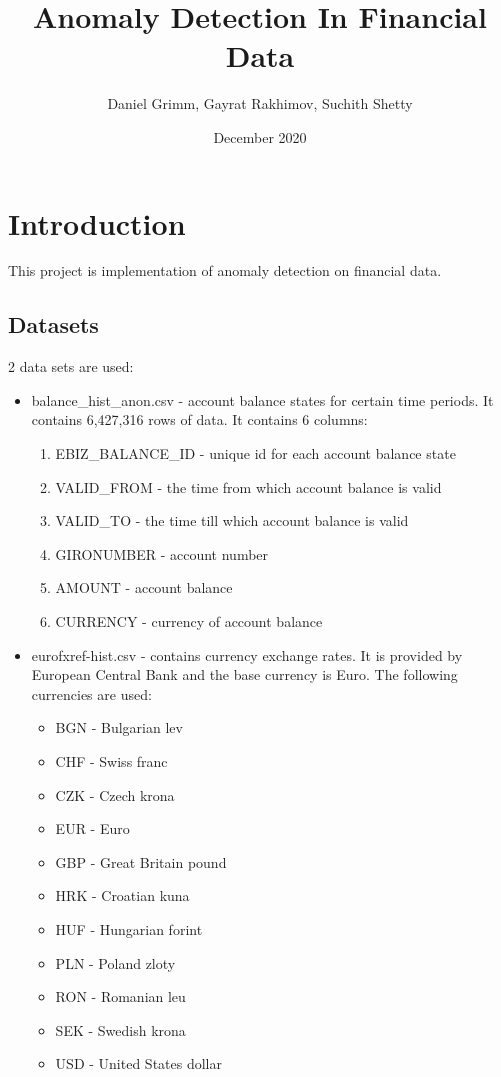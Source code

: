 \documentclass{article}
\title{Anomaly Detection In Financial Data}
\author{Daniel Grimm, Gayrat Rakhimov, Suchith Shetty}
\date{December 2020}
\begin{document}
\maketitle

\section{Introduction}

This project is implementation of anomaly detection on financial data.

\subsection{Datasets}

2 data sets are used:
\begin{itemize}
    \item balance\_hist\_anon.csv - account balance states for certain time periods. It contains 6,427,316 rows of data.
    It contains 6 columns:
    \begin{enumerate}
    \item EBIZ\_BALANCE\_ID - unique id for each account balance state
    \item VALID\_FROM - the time from which account balance is valid
    \item VALID\_TO - the time till which account balance is valid
    \item GIRONUMBER - account number
    \item AMOUNT - account balance
    \item CURRENCY - currency of account balance
    \end{enumerate}
    \item eurofxref-hist.csv - contains currency exchange rates. It is provided by European Central Bank\cite{ecb} and the base currency is Euro. The following currencies are used:
\begin{itemize}
    \item BGN - Bulgarian lev
    \item CHF - Swiss franc
    \item CZK - Czech krona
    \item EUR - Euro
    \item GBP - Great Britain pound
    \item HRK - Croatian kuna
    \item HUF - Hungarian forint
    \item PLN - Poland zloty
    \item RON - Romanian leu
    \item SEK - Swedish krona
    \item USD - United States dollar
\end{itemize}
\end{itemize}
\end{document}
